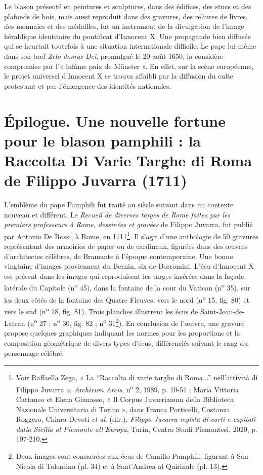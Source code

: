 \documentclass[12pt,twoside,openany]{book}
\begin{document}
Le blason présenté en peintures et sculptures, dans des édifices, des stucs et des plafonds de bois, mais aussi reproduit dans des gravures, des reliures de livres, des monnaies et des médailles, fut un instrument de la divulgation de l’image héraldique identitaire du pontificat d’Innocent X. Une propagande bien diffusée qui se heurtait toutefois à une situation internationale difficile. Le pape lui-même dans son bref \textit{Zelo domus Dei}, promulgué le 20 août 1650, la considère compromise par l’« infâme paix de Münster ». En effet, sur la scène européenne, le projet universel d’Innocent X se trouva affaibli par la diffusion du culte protestant et par l’émergence des identités nationales.

\section{Épilogue. Une nouvelle fortune pour le blason pamphili : la Raccolta Di Varie Targhe di Roma de Filippo Juvarra (1711)}

L’emblème du pape Pamphili fut traité au siècle suivant dans un contexte nouveau et différent. Le \textit{Recueil de diverses targes de Rome faites par les premiers professeurs à Rome, dessinées et gravées} de Filippo Juvarra, fut publié par Antonio De Rossi, à Rome, en 1711\footnote{Voir Raffaella Zega, « La “Raccolta di varie targhe di Roma...” nell'attività di Filippo Juvarra », \textit{Archivum Arcis}, n\textsuperscript{o} 2, 1989, p. 10-51 ; Maria Vittoria Cattaneo et Elena Gianasso, « Il Corpus Juvarrianum della Biblioteca Nazionale Universitaria di Torino », dans Franca Porticelli, Costanza Roggero, Chiara Devoti \textit{et al}. (dir.), \textit{Filippo Juvarra regista di corti e capitali dalla Sicilia al Piemonte all'Europa}, Turin, Centro Studi Piemontesi, 2020, p. 197-210.}. Il s’agit d’une anthologie de 50 gravures représentant des armoiries de papes ou de cardinaux, figurées dans des œuvres d’architectes célèbres, de Bramante à l’époque contemporaine. Une bonne vingtaine d’images proviennent du Bernin, six de Borromini. L’écu d’Innocent X est présent dans les images qui reproduisent les targes insérées dans la façade latérale du Capitole (n\textsuperscript{o} 45), dans la fontaine de la cour du Vatican (n\textsuperscript{o} 35), sur les deux côtés de la fontaine des Quatre Fleuves, vers le nord (n\textsuperscript{o} 15, fig. 80) et vers le sud (n\textsuperscript{o} 18, fig. 81). Trois planches illustrent les écus de Saint-Jean-de-Latran (n\textsuperscript{o} 27 ; n\textsuperscript{o} 30, fig. 82 ; n\textsuperscript{o} 31\footnote{Deux images sont consacrées aux écus de Camillo Pamphili, figurant à San Nicola di Tolentino (pl. 34) et à Sant’Andrea al Quirinale (pl. 13).}). En conclusion de l’œuvre, une gravure propose quelques graphiques indiquant les normes pour les proportions et la composition géométrique de divers types d’écus, différenciés suivant le rang du personnage célébré.
\end{document}

